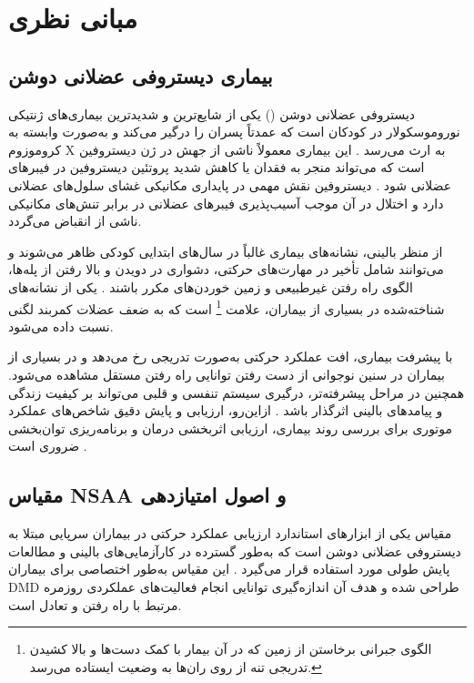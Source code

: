 \section{مبانی نظری}

\subsection{بیماری دیستروفی عضلانی دوشن}

دیستروفی عضلانی دوشن () یکی از شایع‌ترین و شدیدترین بیماری‌های ژنتیکی نوروموسکولار در کودکان است که عمدتاً پسران را درگیر می‌کند و به‌صورت وابسته به کروموزوم X به ارث می‌رسد \cite{Emery2002DMD}. این بیماری معمولاً ناشی از جهش در ژن دیستروفین است که می‌تواند منجر به فقدان یا کاهش شدید پروتئین دیستروفین در فیبرهای عضلانی شود \cite{Hoffman1987Dystrophin}. دیستروفین نقش مهمی در پایداری مکانیکی غشای سلول‌های عضلانی دارد و اختلال در آن موجب آسیب‌پذیری فیبرهای عضلانی در برابر تنش‌های مکانیکی ناشی از انقباض می‌گردد.

از منظر بالینی، نشانه‌های بیماری غالباً در سال‌های ابتدایی کودکی ظاهر می‌شوند و می‌توانند شامل تأخیر در مهارت‌های حرکتی، دشواری در دویدن و بالا رفتن از پله‌ها، الگوی راه رفتن غیرطبیعی و زمین خوردن‌های مکرر باشند \cite{Bushby2010Diagnosis}. یکی از نشانه‌های شناخته‌شده در بسیاری از بیماران، علامت 
\footnote{الگوی جبرانی برخاستن از زمین که در آن بیمار با کمک دست‌ها و بالا کشیدن تدریجی تنه از روی ران‌ها به وضعیت ایستاده می‌رسد.} 
است که به ضعف عضلات کمربند لگنی نسبت داده می‌شود.

با پیشرفت بیماری، افت عملکرد حرکتی به‌صورت تدریجی رخ می‌دهد و در بسیاری از بیماران در سنین نوجوانی از دست رفتن توانایی راه رفتن مستقل مشاهده می‌شود. همچنین در مراحل پیشرفته‌تر، درگیری سیستم تنفسی و قلبی می‌تواند بر کیفیت زندگی و پیامدهای بالینی اثرگذار باشد \cite{Eagle2002Survival}. ازاین‌رو، ارزیابی و پایش دقیق شاخص‌های عملکرد موتوری برای بررسی روند بیماری، ارزیابی اثربخشی درمان و برنامه‌ریزی توان‌بخشی ضروری است \cite{Bushby2010Diagnosis}.

\subsection{مقیاس NSAA و اصول امتیازدهی}

مقیاس  یکی از ابزارهای استاندارد ارزیابی عملکرد حرکتی در بیماران سرپایی مبتلا به دیستروفی عضلانی دوشن است که به‌طور گسترده در کارآزمایی‌های بالینی و مطالعات پایش طولی مورد استفاده قرار می‌گیرد \cite{Scott2009NSAA}. این مقیاس به‌طور اختصاصی برای بیماران DMD طراحی شده و هدف آن اندازه‌گیری توانایی انجام فعالیت‌های عملکردی روزمره مرتبط با راه رفتن و تعادل است.

